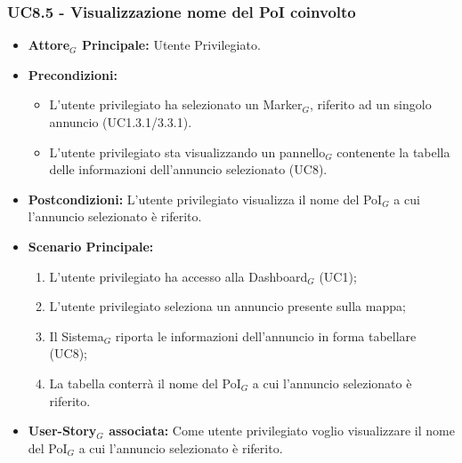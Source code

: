 \documentclass[10pt]{article}
\begin{document}
\begin{justify}
 \subsubsection{\textbf{UC8.5 - Visualizzazione nome del PoI coinvolto}}
 \begin{itemize}
     \item \textbf{Attore$_G$ Principale:} Utente Privilegiato.
     \item \textbf{Precondizioni:}
       \begin{itemize}
    	        \item L'utente privilegiato ha selezionato un Marker$_G$, riferito ad un singolo annuncio (UC1.3.1/3.3.1).
          \item L'utente privilegiato sta visualizzando un pannello$_G$ contenente la tabella delle informazioni dell'annuncio selezionato (UC8).
       \end{itemize}
     \item \textbf{Postcondizioni:} L'utente privilegiato visualizza il nome del PoI$_G$ a cui l'annuncio selezionato è riferito.
     \item \textbf{Scenario Principale:}
        \begin{enumerate}
            \item L'utente privilegiato ha accesso alla Dashboard$_G$ (UC1);
            \item L'utente privilegiato seleziona un annuncio presente sulla mappa;
            \item Il Sistema$_G$ riporta le informazioni dell'annuncio in forma tabellare (UC8);
            \item La tabella conterrà il nome del PoI$_G$ a cui l'annuncio selezionato è riferito.
        \end{enumerate}
     \item \textbf{User-Story$_G$ associata:} Come utente privilegiato voglio visualizzare il nome del PoI$_G$ a cui l'annuncio selezionato è riferito. 
 \end{itemize}

\end{justify}
\end{document}
